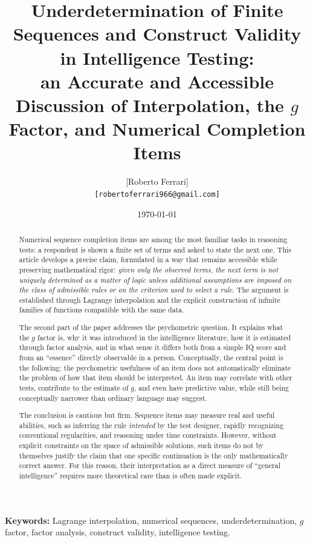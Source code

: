 \documentclass[10pt, a4paper]{article}
\title{\textbf{Underdetermination of Finite Sequences and Construct Validity in Intelligence Testing:\\
an Accurate and Accessible Discussion of Interpolation, the $g$ Factor, and Numerical Completion Items}}
\author{
    [Roberto Ferrari]\\
    \small \texttt{[robertoferrari966@gmail.com]}
}
\date{\today}
\theoremstyle{plain}
\theoremstyle{definition}
\theoremstyle{remark}
\begin{document}
\maketitle
\thispagestyle{empty}

\begin{abstract}
Numerical sequence completion items are among the most familiar tasks in
reasoning tests: a respondent is shown a finite set of terms and asked to state
the next one. This article develops a precise claim, formulated in a way that
remains accessible while preserving mathematical rigor: \emph{given only the
observed terms, the next term is not uniquely determined as a matter of logic
unless additional assumptions are imposed on the class of admissible rules or on
the criterion used to select a rule}. The argument is established through
Lagrange interpolation and the explicit construction of infinite families of
functions compatible with the same data.

The second part of the paper addresses the psychometric question. It explains
what the $g$ factor is, why it was introduced in the intelligence literature,
how it is estimated through factor analysis, and in what sense it differs both
from a simple IQ score and from an ``essence'' directly observable in a person.
Conceptually, the central point is the following: the psychometric usefulness of
an item does not automatically eliminate the problem of how that item should be
interpreted. An item may correlate with other tests, contribute to the estimate
of $g$, and even have predictive value, while still being conceptually narrower
than ordinary language may suggest.

The conclusion is cautious but firm. Sequence items may measure real and useful
abilities, such as inferring the rule \emph{intended} by the test designer,
rapidly recognizing conventional regularities, and reasoning under time
constraints. However, without explicit constraints on the space of admissible
solutions, such items do not by themselves justify the claim that one specific
continuation is the only mathematically correct answer. For this reason, their
interpretation as a direct measure of ``general intelligence'' requires more
theoretical care than is often made explicit.
\end{abstract}

\vspace{1em}
\noindent\textbf{Keywords:} Lagrange interpolation, numerical sequences,
underdetermination, $g$ factor, factor analysis, construct validity,
intelligence testing.
\end{document}
